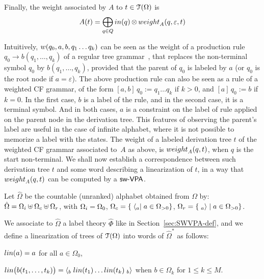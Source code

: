 \medskip\noindent
Finally, the weight associated by $A$ to  $t \in \mathcal{T}(\Omega)$ is
\begin{equation}
A(t)  =
\displaystyle\bigoplus_{q \in Q} \mathsf{in}(q) \mathop{\otimes} \weight_A(q, \varepsilon, t)
\label{eq:weightTA}
\end{equation}

\noindent
Intuitively, $\wei(q_0, a, b, q_1 \ldots q_k)$ can be seen as
the weight of a production rule $q_0 \to b(q_1, \ldots, q_k)$
of a regular tree grammar~\cite{tata},
that replaces the non-terminal symbol $q_0$ by $b(q_1, \ldots, q_k)$,
provided that the parent of $q_0$ is labeled by $a$
(or $q_0$ is the root node if $a = \varepsilon$).
%
The above production rule can also be seen as
a rule of a weighted CF grammar, of the form
$[a, b]\, q_0 := q_1 \ldots q_k$ if $k > 0$,
and $[a]\, q_0 := b$ if $k = 0$.
In the first case, $b$ is a label of the rule,
and in the second case, it is a terminal symbol.
And in both cases, $a$ is a constraint on the label of rule applied
on the parent node in the derivation tree.
This features of observing the parent's label
are useful in the case of infinite alphabet,
where it is not possible to memorize a label with the states.
%
\noindent The weight of a labeled derivation tree $t$
of the weighted CF grammar associated to~$A$ as above,
is $\weight_A(q, t)$,
when $q$ is the start non-terminal.
%
We shall now establish a correspondence between such derivation tree $t$
and some word describing a linearization of $t$,
in a way that $\weight_A(q, t)$ can be computed by a $\textsf{sw-VPA}$.

Let $\hat\Omega$ be the countable (unranked) alphabet obtained
from $\Omega$ by:
$\hat\Omega = \Omegai \uplus \Omegac \uplus \Omegar$, with
$\Omegai = \Omega_0$,
$\Omegac = \{ \; \call{a} \mid a \in \Omega_{>0} \}$,
$\Omegar = \{ \; \return{a} \mid a \in \Omega_{>0} \}$.

\noindent
We associate to $\hat\Omega$
a label theory $\hat{\Phi}$
like in Section~\ref{sec:SWVPA-def},
%
\noindent
and we define a linearization of trees of $\mathcal{T}(\Omega)$ into
words of $\hat{\Omega}^*$ as follows:
\begin{description}
\item $\lin(a) = a$ for all $a \in \Omega_0$,
\item $\lin\bigl( b(t_1, \ldots, t_k)\bigr) =
       \call{b} \; \lin(t_1) \ldots \lin(t_k) \; \return{b}$
       when $b \in \Omega_k$ for $1 \leq k \leq M$.
\end{description}

